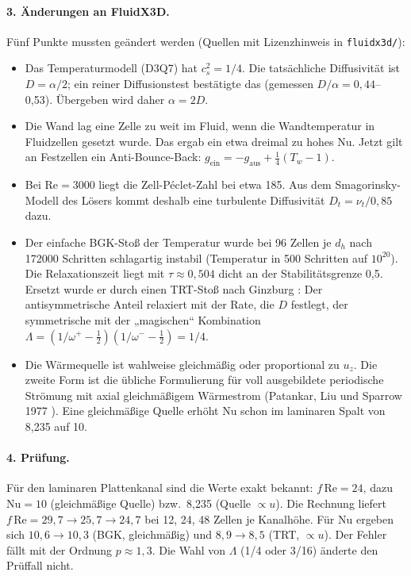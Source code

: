 \paragraph{3. Änderungen an FluidX3D.} Fünf Punkte mussten geändert werden (Quellen mit Lizenzhinweis in
\texttt{fluidx3d/}):
\begin{itemize}
\item Das Temperaturmodell (D3Q7) hat $c_s^2 = 1/4$. Die tatsächliche Diffusivität ist $D = \alpha/2$; ein reiner
  Diffusionstest bestätigte das (gemessen $D/\alpha = 0{,}44$--0,53). Übergeben wird daher $\alpha = 2D$.
\item Die Wand lag eine Zelle zu weit im Fluid, wenn die Wandtemperatur in Fluidzellen gesetzt wurde. Das ergab ein
  etwa dreimal zu hohes Nu. Jetzt gilt an Festzellen ein Anti-Bounce-Back: $g_\text{ein} = -g_\text{aus} +
  \tfrac14(T_w - 1)$.
\item Bei $\mathrm{Re}=3000$ liegt die Zell-Péclet-Zahl bei etwa 185. Aus dem Smagorinsky-Modell des Lösers kommt
  deshalb eine turbulente Diffusivität $D_t = \nu_t/0{,}85$ dazu.
\item Der einfache BGK-Stoß der Temperatur wurde bei 96 Zellen je $d_h$ nach \num{172000} Schritten schlagartig
  instabil (Temperatur in 500 Schritten auf $10^{20}$). Die Relaxationszeit liegt mit $\tau \approx 0{,}504$ dicht an
  der Stabilitätsgrenze 0,5. Ersetzt wurde er durch einen TRT-Stoß nach Ginzburg \cite{ginzburg2005}: Der antisymmetrische Anteil
  relaxiert mit der Rate, die $D$ festlegt, der symmetrische mit der „magischen“ Kombination
  $\Lambda = (1/\omega^+ - \tfrac12)(1/\omega^- - \tfrac12) = 1/4$.
\item Die Wärmequelle ist wahlweise gleichmäßig oder proportional zu $u_z$. Die zweite Form ist die übliche
  Formulierung für voll ausgebildete periodische Strömung mit axial gleichmäßigem Wärmestrom (Patankar, Liu und
  Sparrow 1977 \cite{patankar1977}). Eine gleichmäßige Quelle erhöht Nu schon im laminaren Spalt von 8,235 auf 10.
\end{itemize}

\paragraph{4. Prüfung.} Für den laminaren Plattenkanal sind die Werte exakt bekannt: $f\,\mathrm{Re}=24$, dazu
$\mathrm{Nu}=10$ (gleichmäßige Quelle) bzw.\ 8,235 (Quelle $\propto u$). Die Rechnung liefert $f\,\mathrm{Re} = 29{,}7
\to 25{,}7 \to 24{,}7$ bei 12, 24, 48 Zellen je Kanalhöhe. Für Nu ergeben sich $10{,}6 \to 10{,}3$ (BGK, gleichmäßig)
und $8{,}9 \to 8{,}5$ (TRT, $\propto u$). Der Fehler fällt mit der Ordnung $p \approx 1{,}3$. Die Wahl von $\Lambda$
(1/4 oder 3/16) änderte den Prüffall nicht.

